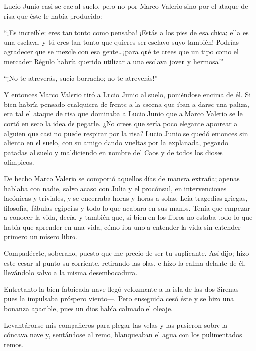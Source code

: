 \documentclass[11pt,openany]{book}
\begin{document}
Lucio Junio casi se cae al suelo, pero no por Marco Valerio sino por el ataque de risa que éste le había producido: 

“¡Es increíble; eres tan tonto como pensaba! ¡Estás a los pies de esa chica; ella es una esclava, y tú eres tan tonto que quieres ser esclavo suyo también! Podrías agradecer que se mezcle con esa gente\dots ¡para qué te crees que un tipo como el mercader Régulo habría querido utilizar a una esclava joven y hermosa!” 

“¡No te atreverás, sucio borracho; no te atreverás!” 

Y entonces Marco Valerio tiró a Lucio Junio al suelo, poniéndose encima de él. Si bien habría pensado cualquiera de frente a la escena que iban a darse una paliza, era tal el ataque de risa que dominaba a Lucio Junio que a Marco Valerio se le cortó en seco la idea de pegarle. ¿No crees que sería poco elegante aporrear a alguien que casi no puede respirar por la risa? Lucio Junio se quedó entonces sin aliento en el suelo, con su amigo dando vueltas por la explanada, pegando patadas al suelo y maldiciendo en nombre del Caos y de todos los dioses olímpicos. 


De hecho Marco Valerio se comportó aquellos días de manera extraña; apenas hablaba con nadie, salvo acaso con Julia y el procónsul, en intervenciones lacónicas y triviales, y se encerraba horas y horas a solas. Leía tragedias griegas, filosofía, fábulas egipcias y todo lo que acabara en sus manos. Tenía que empezar a conocer la vida, decía, y también que, si bien en los libros no estaba todo lo que había que aprender en una vida, cómo iba uno a entender la vida sin entender primero un mísero libro. 

Compadécete, soberano, puesto que me precio de ser tu suplicante.
Así dijo; hizo este cesar al punto su corriente, retirando las olas, e hizo la calma delante de él, llevándolo salvo a la misma desembocadura.

Entretanto la bien fabricada nave llegó velozmente a la isla de las dos Sirenas —pues la impulsaba próspero viento—. Pero enseguida cesó éste y se hizo una bonanza apacible, pues un dios había calmado el oleaje.

Levantáronse mis compañeros para plegar las velas y las
pusieron sobre la cóncava nave y, sentándose al remo,
blanqueaban el agua con los pulimentados remos.
\end{document}
